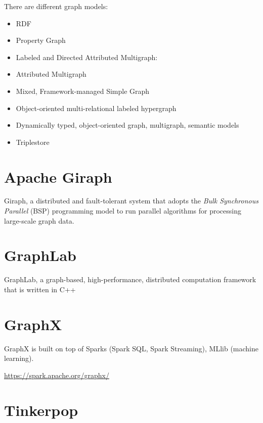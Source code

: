 There are different graph models:
\begin{itemize}
  \item RDF
  \item Property Graph
  
  \item Labeled and Directed Attributed Multigraph:
  
  \item Attributed Multigraph

  \item Mixed, Framework-managed Simple Graph
  
  \item Object-oriented multi-relational labeled hypergraph
  
  \item Dynamically typed, object-oriented graph, multigraph, semantic models
  
  \item Triplestore
\end{itemize}


\section{Apache Giraph}
\label{sec:giraph}

Giraph, a distributed and fault-tolerant system that adopts the {\it Bulk
Synchronous Parallel} (BSP) programming model to run parallel algorithms for
processing large-scale graph data.



\section{GraphLab}
\label{sec:GraphLab}

GraphLab, a graph-based, high-performance, distributed computation framework
that is written in C++


\section{GraphX}
\label{sec:GraphX}


GraphX is built on top of Sparks (Spark SQL, Spark Streaming), MLlib (machine
learning).

\url{https://spark.apache.org/graphx/}

\section{Tinkerpop}
\label{sec:Tinkerpop}